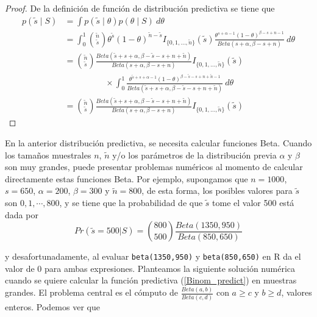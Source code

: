 \documentclass[10pt,openright]{book}\usepackage[]{graphicx}\usepackage[]{color}
\begin{document}
    \begin{proof}
    De la definici\'on de funci\'on de distribuci\'on predictiva se tiene que
    \begin{align*}
    p(\tilde{s} \mid S)&=\int p(\tilde{s} \mid \theta)p(\theta \mid S)\ d\theta\\
    &=\int_0^1 \binom{\tilde{n}}{\tilde{s}} \theta^{\tilde{s}}(1-\theta)^{\tilde{n}-\tilde{s}}I_{\{0,1,\ldots,\tilde{n}\}}(\tilde{s})
    \frac{\theta^{s+\alpha-1}(1-\theta)^{\beta-s+n-1}}{Beta(s+\alpha,\beta-s+n)}\ d\theta\\
    &=\binom{\tilde{n}}{\tilde{s}}\frac{Beta(\tilde{s}+s+\alpha,\beta-\tilde{s}-s+n+\tilde{n})}{Beta(s+\alpha,\beta-s+n)}I_{\{0,1,\ldots,\tilde{n}\}}(\tilde{s})\\
    & \hspace{2cm}\times
    \int_0^1\frac{\theta^{\tilde{s}+s+\alpha-1}(1-\theta)^{\beta-\tilde{s}-s+n+\tilde{n}-1}}
    {Beta(\tilde{s}+s+\alpha,\beta-\tilde{s}-s+n+\tilde{n})}\ d\theta\\
    &=\binom{\tilde{n}}{\tilde{s}}\frac{Beta(\tilde{s}+s+\alpha,\beta-\tilde{s}-s+n+\tilde{n})}{Beta(s+\alpha,\beta-s+n)}I_{\{0,1,\ldots,\tilde{n}\}}(\tilde{s})
    \end{align*}
    \end{proof}
    
    En la anterior distribuci\'on predictiva, se necesita calcular funciones Beta. Cuando los tama\~nos muestrales $n$, $\tilde{n}$ y/o los par\'ametros de la distribuci\'on previa $\alpha$ y $\beta$ son muy grandes, puede presentar problemas num\'ericos al momento de calcular directamente estas funciones Beta. Por ejemplo, supongamos que $n=1000$, $s=650$, $\alpha=200$, $\beta=300$ y $\tilde{n}=800$, de esta forma, los posibles valores para $\tilde{s}$ son $0,1,\cdots,800$, y se tiene que la probabilidad de que $\tilde{s}$ tome el valor 500 est\'a dada por
    \begin{equation}\label{Eje_binom}
    Pr(\tilde{s}=500|S)=\binom{800}{500}\frac{Beta(1350,950)}{Beta(850,650)}
    \end{equation}
    
    y desafortunadamente, al evaluar \texttt{beta(1350,950)} y \texttt{beta(850,650)} en \textsf{R} da el valor de 0 para ambas expresiones. Planteamos la siguiente soluci\'on num\'erica cuando se quiere calcular la funci\'on predictiva (\ref{Binom_predict}) en muestras grandes. El problema central es el c\'omputo de $\frac{Beta(a,b)}{Beta(c,d)}$ con $a\geq c$ y $b\geq d$, valores enteros. Podemos ver que
    
\end{document}
